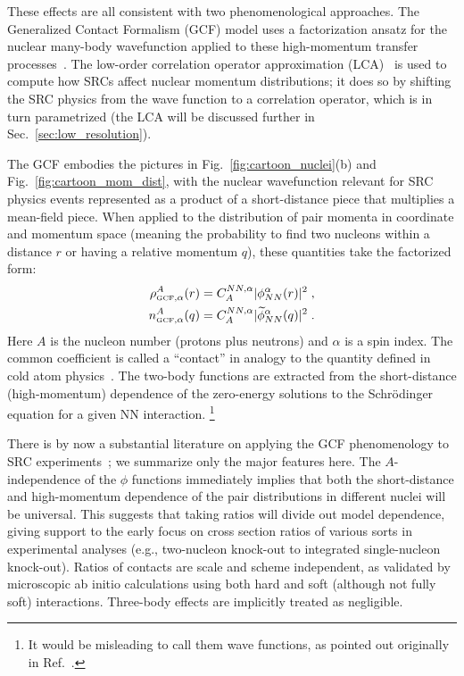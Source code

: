 \documentclass[10pt,aps,prc,floatfix,twocolumn,nofootinbib]{revtex4-1}
\begin{document}
These effects are all consistent with two phenomenological approaches. 
The Generalized Contact Formalism (GCF) model uses a factorization ansatz for the nuclear many-body wavefunction applied to these high-momentum transfer processes~\cite{Weiss:2015mba,Alvioli:2016wwp,Weiss:2016obx,Weiss:2018tbu,Weiss:2021zyb}. 
The low-order correlation operator approximation (LCA)~\cite{Vanhalst:2014cqa,Ryckebusch:2018rct,Ryckebusch:2019oya} is used to compute how SRCs affect nuclear momentum distributions; it does so by shifting the SRC physics from the wave function to a correlation operator, which is in turn parametrized
(the LCA will be discussed further in Sec.~\ref{sec:low_resolution}).

The GCF embodies the pictures in Fig.~\ref{fig:cartoon_nuclei}(b) and Fig.~\ref{fig:cartoon_mom_dist}, with the nuclear wavefunction relevant for SRC physics events represented as a product of a short-distance piece that multiplies a mean-field piece.
When applied to the distribution of pair momenta in coordinate and momentum space (meaning the probability to find two nucleons within a distance $r$ or having a relative momentum $q$), these quantities take the factorized form:
%
\begin{align}
     \rho^A_{{\rm\scriptscriptstyle GCF},\alpha}(r)  &= C_{A}^{NN,\alpha} |\phi^\alpha_{NN}(r)|^2 \;,
     \label{eq:GCF_coordinate}
    \\
    n^A_{{\rm\scriptscriptstyle GCF},\alpha}(q) &= C_{A}^{NN,\alpha} |\widetilde \phi^\alpha_{NN}(q)|^2
    \;. \label{eq:GCF_momentum}
\end{align}
%
Here $A$ is the nucleon number (protons plus neutrons) and $\alpha$ is a spin index.
The common coefficient is called a ``contact'' in analogy to the quantity defined in cold atom physics~\cite{Tan2008contact1,Tan2008contact2}.
The two-body functions are extracted from the short-distance (high-momentum) dependence of the zero-energy solutions to the Schr\"odinger equation for a given NN interaction.%
\footnote{It would be misleading to call them wave functions, as pointed out originally in Ref.~\cite{Brueckner:1955zzd}.}

There is by now a substantial literature on applying the GCF phenomenology to SRC experiments~\cite{Weiss:2015mba,Weiss:2016obx,Weiss:2018tbu,Cruz-Torres:2019fum,Weiss:2021zyb,Pybus:2020itv,Schmidt:2020kcl}; we summarize only the major features here.
The $A$-independence of the $\phi$ functions immediately implies that both the short-distance and high-momentum dependence of the pair distributions in different nuclei will be universal.
This suggests that taking ratios will divide out model dependence, giving support to the early focus on cross section ratios of various sorts in experimental analyses (e.g., two-nucleon knock-out to integrated single-nucleon knock-out).
Ratios of contacts are scale and scheme independent, as validated by microscopic ab initio calculations using both hard and soft (although not fully soft) interactions.
Three-body effects are implicitly treated as negligible.
\end{document}
